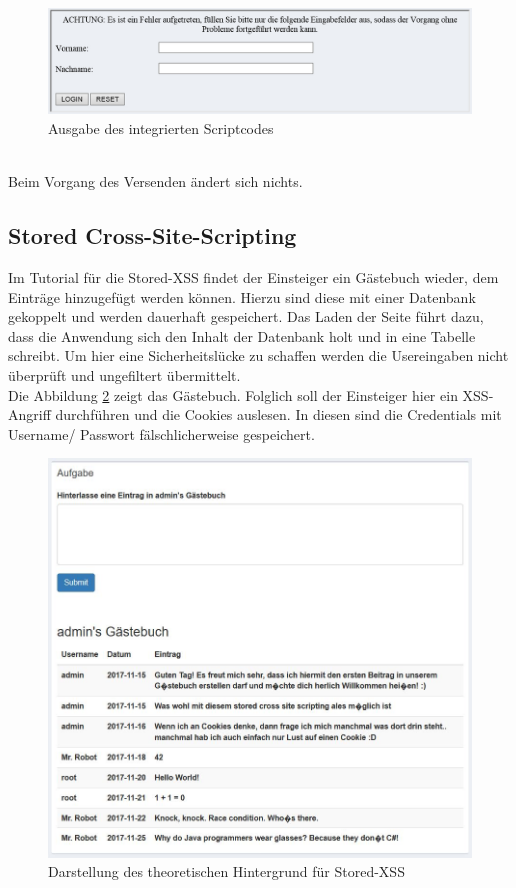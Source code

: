 \ \\

\begin{figure}[h]
	\centering
	\includegraphics[width=\textwidth]{images/XSS/fremdes_anmeldeformular_II.jpg}
	\caption{Ausgabe des integrierten Scriptcodes}
	\label{fig:xss-reflected-ScriptcodeV.1}
\end{figure}
\ \\
Beim Vorgang des Versenden ändert sich nichts.

\newpage


\subsection{Stored Cross-Site-Scripting}
Im Tutorial für die Stored-XSS findet der Einsteiger ein Gästebuch wieder, dem Einträge hinzugefügt werden können. Hierzu sind diese mit einer Datenbank gekoppelt und werden dauerhaft gespeichert. Das Laden der Seite führt dazu, dass die Anwendung sich den Inhalt der Datenbank holt und in eine Tabelle schreibt. Um hier eine Sicherheitslücke zu schaffen werden die Usereingaben nicht überprüft und ungefiltert übermittelt. \\ 
Die Abbildung \ref{fig:stored-xss-aufgabe} zeigt das Gästebuch. Folglich soll der Einsteiger hier ein XSS-Angriff durchführen und die Cookies auslesen. In diesen sind die Credentials mit Username/ Passwort fälschlicherweise gespeichert. \\ 

\begin{figure}[H]
	\centering
	\includegraphics[width=\textwidth]{images/XSS/stored-xss-aufgabe.jpg}
	\caption{Darstellung des theoretischen Hintergrund für Stored-XSS}
	\label{fig:stored-xss-aufgabe}
\end{figure}

